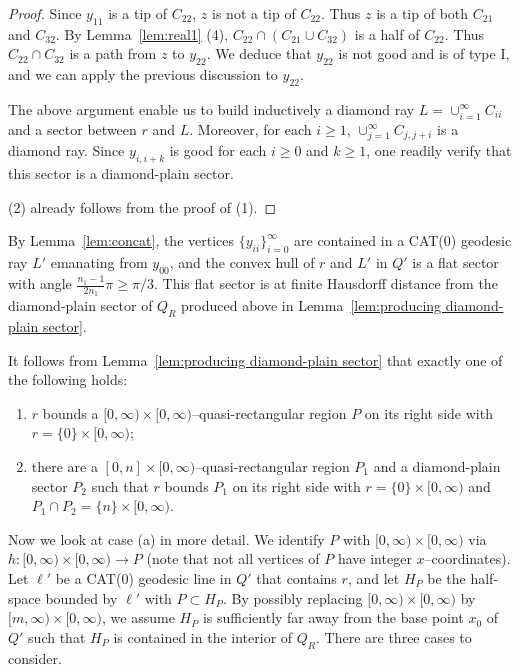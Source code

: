 \documentclass[11pt]{amsart}
\theoremstyle{definition}
\begin{document}
\begin{proof}
	Since $y_{11}$ is a tip of $C_{22}$, $z$ is not a tip of $C_{22}$. Thus $z$ is a tip of both $C_{21}$ and $C_{32}$. By Lemma~\ref{lem:real1} (4), $C_{22}\cap (C_{21}\cup C_{32})$ is a half of $C_{22}$. Thus $C_{22}\cap C_{32}$ is a path from $z$ to $y_{22}$. We deduce that $y_{22}$ is not good and is of type I, and we can apply the previous discussion to $y_{22}$.
	
	The above argument enable us to build inductively a diamond ray $L=\cup_{i=1}^{\infty} C_{ii}$ and a sector between $r$ and $L$. Moreover, for each $i\ge 1$, $\cup_{j=1}^{\infty} C_{j,j+i}$ is a diamond ray. Since $y_{i,i+k}$ is good for each $i\ge 0$ and $k\ge 1$, one readily verify that this sector is a diamond-plain sector.
	
	(2) already follows from the proof of (1).
\end{proof}

By Lemma~\ref{lem:concat}, the vertices $\{y_{ii}\}_{i=0}^{\infty}$ are contained in a CAT(0) geodesic ray $L'$ emanating from $y_{00}$, and the convex hull of $r$ and $L'$ in $Q'$ is a flat sector with angle $\frac{n_1-1}{2n_1}\pi\ge \pi/3$. This flat sector is at finite Hausdorff distance from the diamond-plain sector of $Q_R$ produced above in Lemma~\ref{lem:producing diamond-plain sector}.


It follows from Lemma~\ref{lem:producing diamond-plain sector} that exactly one of the following holds:
\begin{enumerate}[label=(\alph*)]
	\item $r$ bounds a $[0,\infty)\times [0,\infty)$--quasi-rectangular region $P$ on its right side with $r=\{0\}\times [0,\infty)$;
	\item there are a $[0,n]\times [0,\infty)$--quasi-rectangular region $P_1$ and a diamond-plain sector $P_2$ such that $r$ bounds $P_1$ on its right side with $r=\{0\}\times [0,\infty)$ and $P_1\cap P_2=\{n\}\times [0,\infty)$.
\end{enumerate}

Now we look at case (a) in more detail. We identify $P$ with $[0,\infty)\times [0,\infty)$ via $h\colon [0,\infty)\times [0,\infty)\to P$ (note that not all vertices of $P$ have integer $x$--coordinates). Let $\ell'$ be a CAT(0) geodesic line in $Q'$ that contains $r$, and let $H_P$ be the half-space bounded by $\ell'$ with $P\subset H_P$. By possibly replacing $[0,\infty)\times [0,\infty)$ by $[m,\infty)\times [0,\infty)$, we assume $H_P$ is sufficiently far away from the base point $x_0$ of $Q'$ such that $H_P$ is contained in the interior of $Q_R$. There are three cases to consider.
\end{document}
